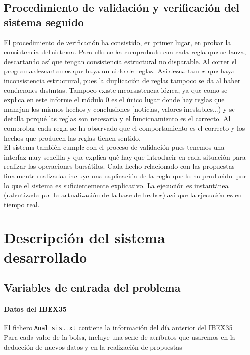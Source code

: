 \documentclass[11pt,leqno]{article}
\theoremstyle{definition_wo_parentheses}
\theoremstyle{plain}
\theoremstyle{remark}
\begin{document}
\subsection{Procedimiento de validación y verificación del sistema seguido}

	El procedimiento de verificación ha consistido, en primer lugar, en probar la consistencia del sistema. Para ello se ha comprobado con cada regla que se lanza, descartando así que tengan consistencia estructural no disparable. Al correr el programa descartamos que haya un ciclo de reglas.  Así descartamos que haya inconsistencia estructural, pues la duplicación de reglas tampoco se da al haber condiciones distintas. Tampoco existe inconsistencia lógica, ya que como se explica en este informe el módulo 0 es el único lugar donde hay reglas que manejan los mismos hechos y conclusiones (noticias, valores inestables...) y se detalla porqué las reglas son necesaria y el funcionamiento es el correcto. Al comprobar cada regla se ha observado que el comportamiento es el correcto y los hechos que producen las reglas tienen sentido.\\
	
	El sistema también cumple con el proceso de validación pues tenemos una interfaz muy sencilla y que explica qué hay que introducir en cada situación para realizar las operaciones bursátiles. Cada hecho relacionado con las propuestas finalmente realizadas incluye una explicación de la regla que lo ha producido, por lo que el sistema es suficientemente explicativo. La ejecución es instantánea (ralentizada por la actualización de la base de hechos) así que la ejecución es en tiempo real.
	

\section{Descripción del sistema desarrollado}

\subsection{Variables de entrada del problema}

	\paragraph{Datos del IBEX35} El fichero \texttt{Analisis.txt} contiene la información del día anterior del IBEX35. Para cada valor de la bolsa, incluye una serie de atributos que usaremos en la deducción de nuevos datos y en la realización de propuestas.
	
\end{document}
